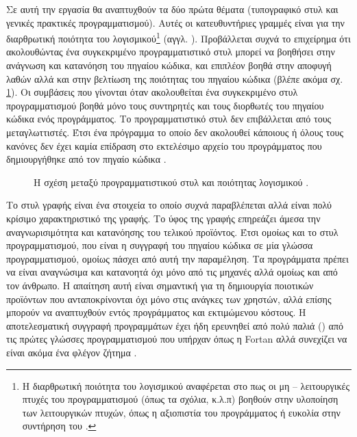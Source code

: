 \documentclass{assignment}
\begin{document}
Σε αυτή την εργασία θα αναπτυχθούν τα δύο πρώτα θέματα (τυπογραφικό στυλ και γενικές πρακτικές προγραμματισμού). Αυτές οι κατευθυντήριες γραμμές είναι για την διαρθρωτική ποιότητα του λογισμικού\footnote{Η διαρθρωτική ποιότητα του λογισμικού αναφέρεται στο πως οι μη -- λειτουργικές πτυχές του προγραμματισμού (όπως τα σχόλια, κ.λ.π) βοηθούν στην υλοποίηση των λειτουργικών πτυχών, όπως η αξιοπιστία του προγράμματος ή ευκολία στην συντήρηση του \cite{wiki:Software_quality}.} (αγγλ. ). Προβάλλεται συχνά το επιχείρημα ότι ακολουθώντας ένα συγκεκριμένο προγραμματιστικό στυλ μπορεί να βοηθήσει στην ανάγνωση και κατανόηση του πηγαίου κώδικα, και επιπλέον βοηθά στην αποφυγή λαθών αλλά και στην βελτίωση της ποιότητας του πηγαίου κώδικα \cite{ala2004supporting,Ayerbe,Cox,WangZH08} (βλέπε ακόμα σχ. \ref{fig:coding_standard_to_software_quality}). Οι συμβάσεις που γίνονται όταν ακολουθείται ένα συγκεκριμένο στυλ προγραμματισμού βοηθά μόνο τους συντηρητές και τους διορθωτές του πηγαίου κώδικα ενός προγράμματος. Το προγραμματιστικό στυλ δεν επιβάλλεται από τους μεταγλωττιστές. Έτσι ένα πρόγραμμα το οποίο δεν ακολουθεί κάποιους ή όλους τους κανόνες δεν έχει καμία επίδραση στο εκτελέσιμο αρχείο του προγράμματος που δημιουργήθηκε από τον πηγαίο κώδικα \cite{wiki:coding_convetions,wiki:Programming_style}.

\begin{figure}
\begin{center}
\caption[Η σχέση μεταξύ προγραμματιστικού στυλ και ποιότητας λογισμικο]{Η σχέση μεταξύ προγραμματιστικού στυλ και ποιότητας λογισμικού \cite{WangZH08}. }
\label{fig:coding_standard_to_software_quality}
\end{center}
\end{figure}

Το στυλ γραφής είναι ένα στοιχεία το οποίο συχνά παραβλέπεται αλλά είναι πολύ κρίσιμο χαρακτηριστικό της γραφής. Το ύφος της γραφής επηρεάζει άμεσα την αναγνωρισιμότητα και κατανόησης του τελικού προϊόντος. Έτσι ομοίως και το στυλ προγραμματισμού, που είναι η συγγραφή του πηγαίου κώδικα σε μία γλώσσα προγραμματισμού, ομοίως πάσχει από αυτή την παραμέληση. Τα προγράμματα πρέπει να είναι αναγνώσιμα και κατανοητά όχι μόνο από τις μηχανές αλλά ομοίως και από τον άνθρωπο. Η απαίτηση αυτή είναι σημαντική για τη δημιουργία ποιοτικών προϊόντων που ανταποκρίνονται όχι μόνο στις ανάγκες των χρηστών, αλλά επίσης μπορούν να αναπτυχθούν εντός προγράμματος και εκτιμώμενου κόστους. Η αποτελεσματική συγγραφή προγραμμάτων έχει ήδη ερευνηθεί από πολύ παλιά (\cite{Kernighan}) από τις πρώτες γλώσσες προγραμματισμού που υπήρχαν όπως η Fortan αλλά συνεχίζει να είναι ακόμα ένα φλέγον ζήτημα \cite{ala2004supporting,Kondoh200682}. 
\end{document}
